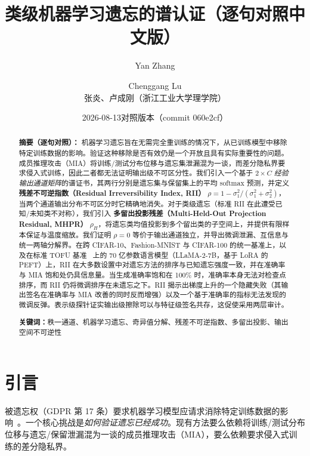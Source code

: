 \documentclass[11pt,a4paper]{article}
\title{类级机器学习遗忘的谱认证（逐句对照中文版）}
\author{Yan Zhang \and Chenggang Lu\\[4pt] {\small 张炎、卢成刚（浙江工业大学理学院）}}
\date{2026-08-13\quad 对照版本（commit 060e2cf）}
\begin{document}
\maketitle

\begin{abstract}
\noindent
\textbf{摘要（逐句对照）：}
机器学习遗忘旨在无需完全重训练的情况下，从已训练模型中移除特定训练数据的影响。验证这种移除是否有效仍是一个开放且具有实际重要性的问题。成员推理攻击（MIA）将训练/测试分布位移与遗忘集泄漏混为一谈，而差分隐私界要求侵入式训练，因此二者都无法证明输出级不可区分性。我们引入一个基于 $2\times C$ \emph{经验输出通道矩阵}的谱证书，其两行分别是遗忘集与保留集上的平均 softmax 预测，并定义 \textbf{残差不可逆指数（Residual Irreversibility Index, RII）} $\rho=1-\sigma_1^2/(\sigma_1^2+\sigma_2^2)$，当两个通道输出分布不可区分时它精确地消失。对于类级遗忘（标准 RII 在此遭受已知/未知类不对称），我们引入 \textbf{多留出投影残差（Multi-Held-Out Projection Residual, MHPR）} $\rho_H$，将遗忘类均值投影到多个留出类的子空间上，并提供有限样本保证与温度缩放。我们证明 $\rho=0$ 等价于输出通道独立，并导出微调泄漏、互信息与统一两轴分解界。在跨 CIFAR-10、Fashion-MNIST 与 CIFAR-100 的统一基准上，以及在标准 TOFU 基准~\cite{maini2024tofu} 上的 70 亿参数语言模型（LLaMA-2-7B，基于 LoRA 的 PEFT）上，RII 在大多数设置中对遗忘方法的排序与已知遗忘强度一致，并在准确率与 MIA 饱和处仍具信息量。当生成准确率饱和在 100\% 时，准确率本身无法对检查点排序，而 RII 仍将微调排序在未遗忘之下。RII 揭示出梯度上升的一个隐藏失败（其输出签名在准确率与 MIA 改善的同时反而增强）以及一个基于准确率的指标无法发现的微调反弹。表示级探针证实输出级擦除可以与特征级签名共存，这促使采用两层审计。

\medskip
\noindent\textbf{关键词：}秩一通道、机器学习遗忘、奇异值分解、残差不可逆指数、多留出投影、输出空间不可逆性
\end{abstract}

\section{引言}
\label{sec:intro}

被遗忘权（GDPR 第 17 条）要求机器学习模型应请求消除特定训练数据的影响~\cite{bourtoule2021machine,nguyen2025survey}。一个核心挑战是\emph{如何验证遗忘已经成功}。现有方法要么依赖将训练/测试分布位移与遗忘/保留泄漏混为一谈的成员推理攻击（MIA），要么依赖要求侵入式训练的差分隐私界。
\end{document}
